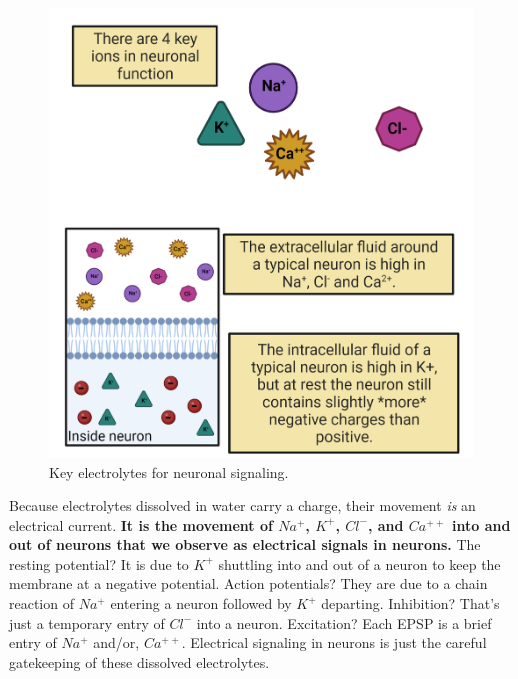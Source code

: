 \documentclass[
]{book}
\begin{document}
\begin{figure}

{\centering \includegraphics[width=0.9\linewidth]{images/ch02/02_14} 

}

\caption{Key electrolytes for neuronal signaling.}\label{fig:ch02-electrolytes}
\end{figure}

Because electrolytes dissolved in water carry a charge, their movement \emph{is} an electrical current. \textbf{It is the movement of \(Na^+\), \(K^+\), \(Cl^{-}\), and \(Ca^{++}\) into and out of neurons that we observe as electrical signals in neurons.} The resting potential? It is due to \(K^+\) shuttling into and out of a neuron to keep the membrane at a negative potential. Action potentials? They are due to a chain reaction of \(Na^+\) entering a neuron followed by \(K^+\) departing. Inhibition? That's just a temporary entry of \(Cl^{-}\) into a neuron. Excitation? Each EPSP is a brief entry of \(Na^+\) and/or, \(Ca^{++}\). Electrical signaling in neurons is just the careful gatekeeping of these dissolved electrolytes.
\end{document}
